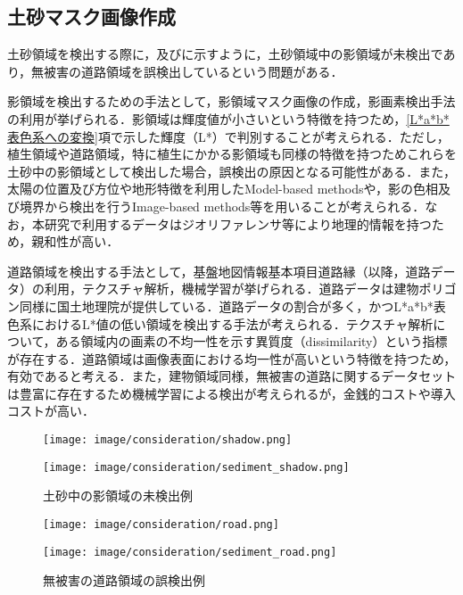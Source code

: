     \subsection*{土砂マスク画像作成}
      土砂領域を検出する際に，及びに示すように，土砂領域中の影領域が未検出であり，無被害の道路領域を誤検出しているという問題がある．

      影領域を検出するための手法として，影領域マスク画像の作成，影画素検出手法の利用が挙げられる．影領域は輝度値が小さいという特徴を持つため，\ref{L*a*b*表色系への変換}項で示した輝度（L*）で判別することが考えられる．ただし，植生領域や道路領域，特に植生にかかる影領域も同様の特徴を持つためこれらを土砂中の影領域として検出した場合，誤検出の原因となる可能性がある．また，太陽の位置及び方位や地形特徴を利用したModel-based methodsや，影の色相及び境界から検出を行うImage-based methods等を用いることが考えられる．なお，本研究で利用するデータはジオリファレンサ等により地理的情報を持つため，親和性が高い\cite{影領域検出}．

      道路領域を検出する手法として，基盤地図情報基本項目道路縁（以降，道路データ）の利用，テクスチャ解析，機械学習が挙げられる．道路データは建物ポリゴン同様に国土地理院が提供している．道路データの割合が多く，かつL*a*b*表色系におけるL*値の低い領域を検出する手法が考えられる．テクスチャ解析について，ある領域内の画素の不均一性を示す異質度（dissimilarity）という指標が存在する\cite{異質度}．道路領域は画像表面における均一性が高いという特徴を持つため，有効であると考える．また，建物領域同様，無被害の道路に関するデータセットは豊富に存在するため機械学習による検出が考えられるが，金銭的コストや導入コストが高い．

      \begin{figure}[tbp]
        \begin{minipage}[c]{0.5\hsize}
          \centering
          \texttt{[image: image/consideration/shadow.png]}
        \end{minipage}
        \begin{minipage}[c]{0.5\hsize}
          \centering
          \texttt{[image: image/consideration/sediment\_shadow.png]}
        \end{minipage}
        \caption{土砂中の影領域の未検出例}
        \label{影領域}
      \end{figure}
      
      \begin{figure}[tbp]
        \begin{minipage}[c]{0.5\hsize}
          \centering
          \texttt{[image: image/consideration/road.png]}
        \end{minipage}
        \begin{minipage}[c]{0.5\hsize}
          \centering
          \texttt{[image: image/consideration/sediment\_road.png]}
        \end{minipage}
        \caption{無被害の道路領域の誤検出例}
        \label{道路領域}
      \end{figure}



